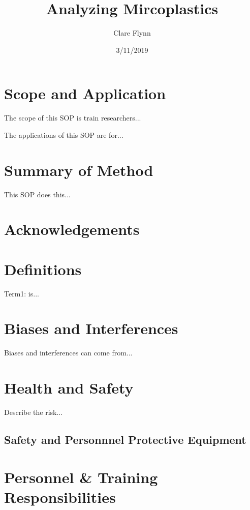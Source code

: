\documentclass[12pt]{../SOP4_alpha}\usepackage[]{graphicx}\usepackage[]{color}
\title{Analyzing Mircoplastics}
\date{3/11/2019}
\author{Clare Flynn}
\begin{document}
\maketitle

\section{Scope and Application}

\NP The scope of this SOP is train researchers...

\NP The applications of this SOP are for...

\section{Summary of Method}

\NP This SOP does this...

\tableofcontents

\newpage

\section{Acknowledgements}

\section{Definitions}

\NP Term1: is...

\section{Biases and Interferences}

\NP Biases and interferences can come from...

\section{Health and Safety}

\NP Describe the risk...


\subsection{Safety and Personnnel Protective Equipment}


\section{Personnel \& Training Responsibilities}
\end{document}
